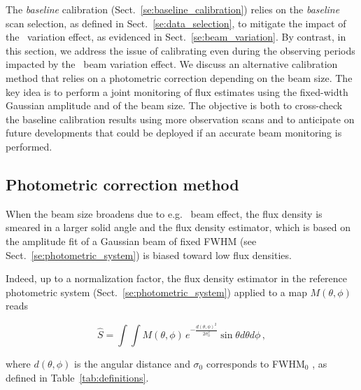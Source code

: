 

The \emph{baseline} calibration (Sect.~\ref{se:baseline_calibration}) relies on
the \emph{baseline} scan selection, as defined in
Sect.~\ref{se:data_selection}, to mitigate the impact of
the \afternoon\ variation effect, as evidenced in Sect.~\ref{se:beam_variation}.
By contrast, in this section, we
address the issue of calibrating even during the observing periods
impacted by the \afternoon\ beam variation effect. We discuss an
alternative calibration method that
relies on a photometric correction depending on the beam size.
{\lp The key idea is to perform a joint monitoring of flux estimates
  using the fixed-width Gaussian amplitude and of the beam size.}
The objective is both to cross-check the baseline calibration results
using more observation scans and to anticipate on future developments
that could be deployed if an accurate beam monitoring is performed.


\subsection{Photometric correction method}
\label{se:photometric_correction_method}

When the beam size broadens due to e.g. \afternoon\ beam effect, the flux
density is smeared in a larger solid angle and the flux density estimator, which
is based on the amplitude fit of a Gaussian beam of fixed FWHM (see
Sect.~\ref{se:photometric_system}) is biased toward low flux
densities.

Indeed, up to a normalization factor, the flux density
estimator in the reference photometric system (Sect.~\ref{se:photometric_system}) applied to a map
$M(\theta,\phi)$ reads

\begin{equation}
  \hat{S}  = \int \int M(\theta, \phi)\, e^{-\frac{d(\theta,\phi)^{2}}{2\sigma_{0}^{2}}} \sin \theta d\theta d\phi\,,
  \label{eq:flux_density_estimator}
\end{equation}

where $d(\theta,\phi)$ is the angular distance and $\sigma_0$
corresponds to FWHM$_0$
, as defined in Table~\ref{tab:definitions}.

